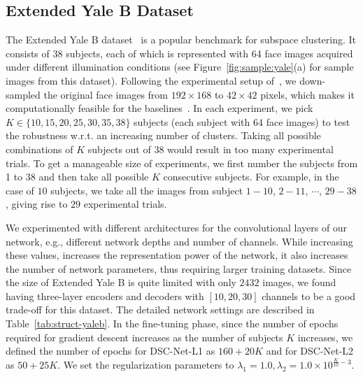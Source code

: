 \documentclass{article}
\begin{document}
\subsection{Extended Yale B Dataset}

The Extended Yale B dataset~\cite{lee2005acquiring} is a popular benchmark for subspace clustering. It consists of 38 subjects, each of which is represented with 64 face images acquired under different illumination conditions (see Figure~\ref{fig:sample:yale}(a) for sample images from this dataset). Following the experimental setup of~\cite{elhamifar2013sparse}, we down-sampled the original face images from $192 \times 168$ to $42 \times 42$ pixels, which makes it computationally feasible for the baselines~\cite{elhamifar2013sparse,liu2013robust}. 
In each experiment, we pick $K \in \{10,15,20,25,30,35,38\}$ subjects (each subject with 64 face images) to test the robustness w.r.t. an increasing number of clusters. 
Taking all possible combinations of $K$ subjects out of 38 would result in too many experimental trials. To get a manageable size of experiments, we first number the subjects from 1 to 38 and then take all possible $K$ consecutive subjects. For example, in the case of $10$ subjects, we take all the images from subject $1-10$, $2-11$, $\cdots$, $29-38$, giving rise to $29$ experimental trials. 


We experimented with different architectures for the convolutional layers of our network, e.g., different network depths and number of channels. While increasing these values, increases the representation power of the network, it also increases the number of network parameters, thus requiring larger training datasets. Since the size of Extended Yale B is quite limited with only $2432$ images, we found having three-layer encoders and decoders with $[10, 20, 30]$ channels  to be a good trade-off for this dataset. The detailed network settings are described in Table~\ref{tab:struct-yaleb}. In the fine-tuning phase, since the number of epochs required for gradient descent increases as the number of subjects $K$ increases, we defined the number of epochs for DSC-Net-L1 as $160 + 20K$ and for DSC-Net-L2 as $50 + 25K$. We set the regularization parameters to $\lambda_1 = 1.0, \lambda_2 = 1.0\times 10^{\frac{K}{10}-3}$.
\end{document}
